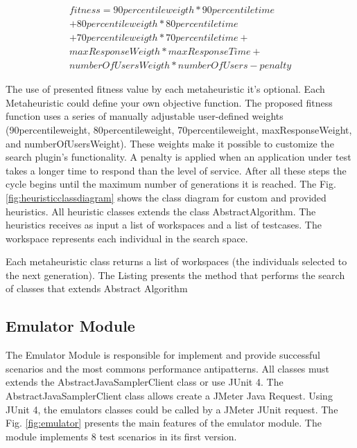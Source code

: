 \documentclass[times]{stvrauth}
\begin{document}
\begin{equation}
\begin{aligned}
fitness=90percentileweigth* 90percentiletime\\
+80percentileweigth*80percentiletime\\+
70percentileweigth*70percentiletime+\\
maxResponseWeigth*maxResponseTime+\\
numberOfUsersWeigth*numberOfUsers-penalty
\end{aligned}
\end{equation}

The use of presented fitness value by each metaheuristic it's optional. Each Metaheuristic could define your own objective function. The proposed  fitness function uses a series of manually adjustable user-defined weights (90percentileweight, 80percentileweight,  70percentileweight, maxResponseWeight, and numberOfUsersWeight). These weights make it possible to customize the search plugin's functionality. A penalty is applied when an application under test takes a longer time to respond than the level of service. After all these steps the cycle begins until the maximum number of generations it is reached. The Fig. \ref{fig:heuristicclassdiagram} shows the  class diagram for custom and provided heuristics. All heuristic classes extends the class AbstractAlgorithm. The heuristics receives  as input a  list of workspaces and a list of testcases. The workspace represents each individual in the search space.


Each metaheuristic class returns a list of workspaces (the individuals selected to the next generation). The Listing presents the method that performs the search of classes that extends Abstract Algorithm



\subsection{Emulator Module}

The Emulator Module is responsible for implement and provide successful scenarios and the most commons performance antipatterns. All classes must extends the AbstractJavaSamplerClient class or use JUnit 4. The AbstractJavaSamplerClient class allows create a JMeter Java Request.  Using JUnit 4, the emulators classes could be called by a JMeter JUnit request. The Fig. \ref{fig:emulator} presents the main features of the emulator module. The module implements 8 test scenarios in its first version.
\end{document}
